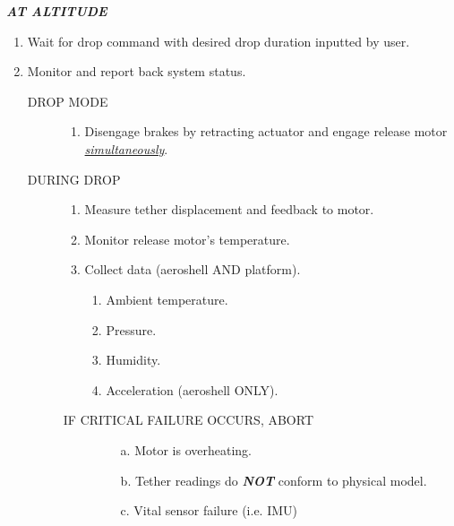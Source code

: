 \noindent\textbf{\textit{AT ALTITUDE}}
\begin{enumerate}
    \item Wait for drop command with desired drop duration inputted by user.
    \item Monitor and report back system status.
    
    \begin{description}
        \item[DROP MODE] \hfill
        \begin{enumerate}[noitemsep, nolistsep, label*=\arabic*.]
            \item Disengage brakes by retracting actuator and engage release motor \textit{\underline{simultaneously}}.
        \end{enumerate}
    \end{description}
    
    \begin{description}
        \item[DURING DROP] \hfill
        \begin{enumerate}[noitemsep, nolistsep, label*=\arabic*.]
            \item Measure tether displacement and feedback to motor.
            \item Monitor release motor’s temperature.
            \item Collect data (aeroshell AND platform).
            \begin{enumerate}[noitemsep, nolistsep, label*=\arabic*.]
                \item Ambient temperature.
                \item Pressure.
                \item Humidity.
                \item Acceleration (aeroshell ONLY).
            \end{enumerate}
        \end{enumerate}
        
        \begin{description}
            \item[IF CRITICAL FAILURE OCCURS, ABORT] \hfill
            \begin{enumerate}[noitemsep, nolistsep, label*=\arabic*.]
                \item[a.] Motor is overheating.
                \item[b.] Tether readings do \textbf{\textit{NOT}} conform to physical model.
                \item[c.] Vital sensor failure (i.e. IMU)
            \end{enumerate}
        \end{description}
    \end{description}
\end{enumerate}

